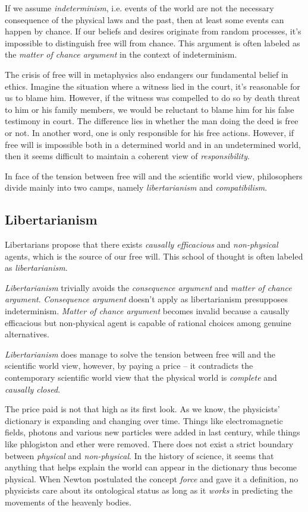 If we assume \emph{indeterminism}, i.e. events of the world are not the necessary consequence of the physical laws and the past, then at least some events can happen by chance. If our beliefs and desires originate from random processes, it’s impossible to distinguish free will from chance. This argument is often labeled as the \emph{matter of chance argument} in the context of indeterminism.

The crisis of free will in metaphysics also endangers our fundamental belief in ethics. Imagine the situation where a witness lied in the court, it's reasonable for us to blame him. However, if the witness was compelled to do so by death threat to him or his family members, we would be reluctant to blame him for his false testimony in court. The difference lies in whether the man doing the deed is free or not. In another word, one is only responsible for his free actions. However, if free will is impossible both in a determined world and in an undetermined world, then it seems difficult to maintain a coherent view of \emph{responsibility}.

In face of the tension between free will and the scientific world view, philosophers divide mainly into two camps, namely \emph{libertarianism} and \emph{compatibilism}.

\subsection{Libertarianism}

Libertarians propose that there exists \emph{causally efficacious} and \emph{non-physical} agents, which is the source of our free will. This school of thought is often labeled as \emph{libertarianism}.

\emph{Libertarianism} trivially avoids the \emph{consequence argument} and \emph{matter of chance argument}. \emph{Consequence argument} doesn't apply as libertarianism presupposes indeterminism. \emph{Matter of chance argument} becomes invalid because a causally efficacious but non-physical agent is capable of rational choices among genuine alternatives.

\emph{Libertarianism} does manage to solve the tension between free will and the scientific world view, however, by paying a price -- it contradicts the contemporary scientific world view that the physical world is \emph{complete} and \emph{causally closed}.

The price paid is not that high as its first look. As we know, the physicists' dictionary is expanding and changing over time. Things like electromagnetic fields, photons and various new particles were added in last century, while things like phlogiston and ether were removed. There does not exist a strict boundary between \emph{physical} and \emph{non-physical}. In the history of science, it seems that anything that helps explain the world can appear in the dictionary thus become physical. When Newton postulated the concept \emph{force} and gave it a definition, no physicists care about its ontological status as long as it \emph{works} in predicting the movements of the heavenly bodies.

